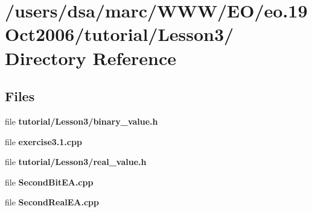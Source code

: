 \section{/users/dsa/marc/WWW/EO/eo.19Oct2006/tutorial/Lesson3/ Directory Reference}
\label{dir_000005}
\subsection*{Files}
\begin{CompactItemize}
\item 
file {\bf tutorial/Lesson3/binary_value.h}
\item 
file {\bf exercise3.1.cpp}
\item 
file {\bf tutorial/Lesson3/real_value.h}
\item 
file {\bf SecondBitEA.cpp}
\item 
file {\bf SecondRealEA.cpp}
\end{CompactItemize}
